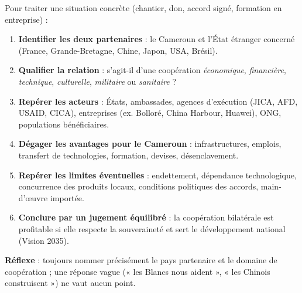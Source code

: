 \documentclass[11pt]{article}
\newcommand{\cle}[1]{{\popxbold\color{popdark}#1}}
\begin{document}
\begin{methode}
Pour traiter une situation concrète (chantier, don, accord signé, formation en entreprise) :
\begin{enumerate}
\item \textbf{Identifier les deux partenaires} : le Cameroun et l'État étranger concerné (France, Grande-Bretagne, Chine, Japon, USA, Brésil).
\item \textbf{Qualifier la relation} : s'agit-il d'une coopération \emph{économique}, \emph{financière}, \emph{technique}, \emph{culturelle}, \emph{militaire} ou \emph{sanitaire} ?
\item \textbf{Repérer les acteurs} : États, ambassades, agences d'exécution (JICA, AFD, USAID, CICA), entreprises (ex. Bolloré, China Harbour, Huawei), ONG, populations bénéficiaires.
\item \textbf{Dégager les avantages pour le Cameroun} : infrastructures, emplois, transfert de technologies, formation, devises, désenclavement.
\item \textbf{Repérer les limites éventuelles} : endettement, dépendance technologique, concurrence des produits locaux, conditions politiques des accords, main-d'œuvre importée.
\item \textbf{Conclure par un jugement équilibré} : la coopération bilatérale est profitable si elle respecte la \cle{souveraineté} et sert le \cle{développement national} (Vision 2035).
\end{enumerate}
\textbf{Réflexe} : toujours nommer précisément le pays partenaire et le domaine de coopération ; une réponse vague (« les Blancs nous aident », « les Chinois construisent ») ne vaut aucun point.
\end{methode}
\end{document}
